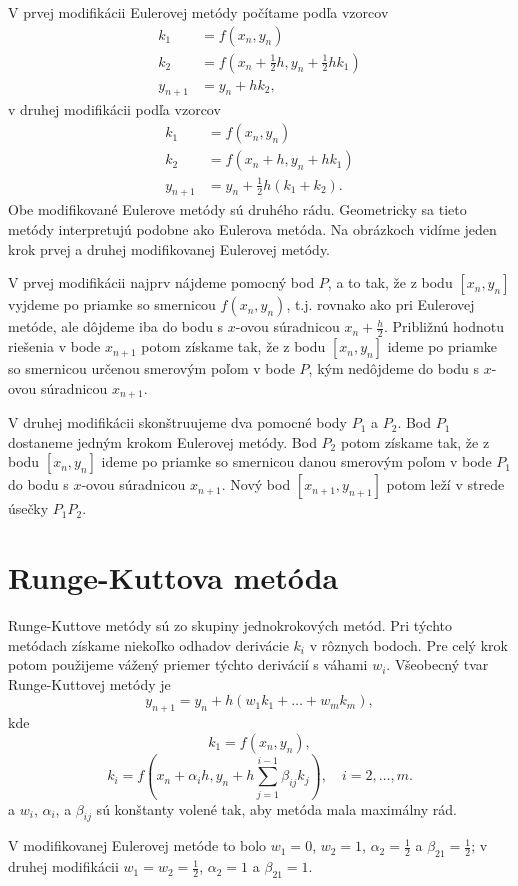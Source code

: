 V prvej modifikácii Eulerovej metódy počítame podľa vzorcov
\begin{align*}
k_1 &= f(x_n, y_n) \\
k_2 &= f\left(x_n + \frac{1}{2}h, y_n + \frac{1}{2}hk_1\right) \\
y_{n+1} &= y_n + hk_2,
\end{align*}
v druhej modifikácii podľa vzorcov
\begin{align*}
k_1 &= f(x_n, y_n) \\
k_2 &= f(x_n + h, y_n + hk_1) \\
y_{n+1} &= y_n + \frac{1}{2}h(k_1 + k_2).
\end{align*}
Obe modifikované Eulerove metódy sú druhého rádu. Geometricky sa tieto metódy interpretujú podobne ako Eulerova metóda. Na obrázkoch vidíme jeden krok prvej a druhej modifikovanej Eulerovej metódy.

V prvej modifikácii najprv nájdeme pomocný bod $P$, a to tak, že z bodu \([x_n, y_n]\) vyjdeme po priamke so smernicou \(f(x_n, y_n)\), t.j. rovnako ako pri Eulerovej metóde, ale dôjdeme iba do bodu s \(x\)-ovou súradnicou \(x_n + \frac{h}{2}\). Približnú hodnotu riešenia v bode \(x_{n+1}\) potom získame tak, že z bodu \([x_n, y_n]\) ideme po priamke so smernicou určenou smerovým poľom v bode \(P\), kým nedôjdeme do bodu s \(x\)-ovou súradnicou \(x_{n+1}\).

V druhej modifikácii skonštruujeme dva pomocné body \(P_1\) a \(P_2\). Bod \(P_1\) dostaneme jedným krokom Eulerovej metódy. Bod \(P_2\) potom získame tak, že z bodu \([x_n, y_n]\) ideme po priamke so smernicou danou smerovým poľom v bode \(P_1\) do bodu s \(x\)-ovou súradnicou \(x_{n+1}\). Nový bod \([x_{n+1}, y_{n+1}]\) potom leží v strede úsečky \(P_1P_2\).

\section{Runge-Kuttova metóda}
Runge-Kuttove metódy sú zo skupiny jednokrokových metód. Pri týchto metódach získame niekoľko odhadov derivácie $k_i$ v rôznych bodoch. Pre celý krok potom použijeme vážený priemer týchto derivácií s váhami $w_i$. Všeobecný tvar Runge-Kuttovej metódy je
\[ y_{n+1} = y_n + h(w_1k_1 + \ldots + w_mk_m), \]
kde
\[ k_1 = f(x_n, y_n), \]
\[ k_i = f(x_n + \alpha_ih, y_n + h \sum_{j=1}^{i-1} \beta_{ij}k_j), \quad i = 2, \ldots, m. \]
a \(w_i\), \(\alpha_i\), a \(\beta_{ij}\) sú konštanty volené tak, aby metóda mala maximálny rád.

V modifikovanej Eulerovej metóde to bolo \(w_1 = 0\), \(w_2 = 1\), \(\alpha_2 = \frac{1}{2}\) a \(\beta_{21} = \frac{1}{2}\); v druhej modifikácii \(w_1 = w_2 = \frac{1}{2}\), \(\alpha_2 = 1\) a \(\beta_{21} = 1\).


